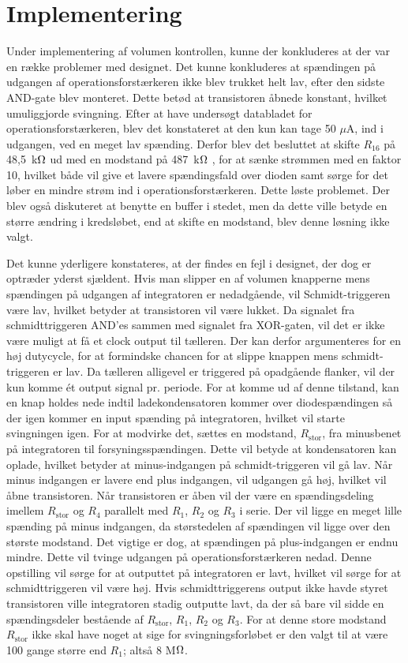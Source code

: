 \section{Implementering}
Under implementering af volumen kontrollen, kunne der konkluderes at der var en række problemer med designet. Det kunne konkluderes at spændingen på udgangen af operationsforstærkeren ikke blev trukket helt lav, efter den sidste AND-gate blev monteret. Dette betød at transistoren åbnede konstant, hvilket umuliggjorde svingning. Efter at have undersøgt databladet for operationsforstærkeren, blev det konstateret at den kun kan tage 50 $\mu$A, ind i udgangen, ved en meget lav spænding. Derfor blev det besluttet at skifte $R_{16}$ på 48,5~k$\ohm$ ud med en modstand på 487~k$\ohm$ , for at sænke strømmen med en faktor 10, hvilket både vil give et lavere spændingsfald over dioden samt sørge for det løber en mindre strøm ind i operationsforstærkeren. Dette løste problemet. Der blev også diskuteret at benytte en buffer i stedet, men da dette ville betyde en større ændring i kredsløbet, end at skifte en modstand, blev denne løsning ikke valgt.

Det kunne yderligere konstateres, at der findes en fejl i designet, der dog er optræder yderst sjældent. Hvis man slipper en af volumen knapperne  mens spændingen på udgangen af integratoren er nedadgående, vil Schmidt-triggeren være lav, hvilket betyder at transistoren vil være lukket. Da signalet fra schmidttriggeren AND'es sammen med signalet fra XOR-gaten, vil det er ikke være muligt at få et clock output til tælleren. Der kan derfor argumenteres for en høj dutycycle, for at formindske chancen for at slippe knappen mens schmidt-triggeren er lav. Da tælleren alligevel er triggered på opadgående flanker, vil der kun komme ét output signal pr. periode. For at komme ud af denne tilstand, kan en knap holdes nede indtil ladekondensatoren kommer over diodespændingen så der igen kommer en input spænding på integratoren, hvilket vil starte svingningen igen. 
For at modvirke det, sættes en modstand, $R_{\mathrm{stor}}$, fra minusbenet på integratoren til forsyningsspændingen. Dette vil betyde at kondensatoren kan oplade, hvilket betyder at minus-indgangen på schmidt-triggeren vil gå lav. Når minus indgangen er lavere end plus indgangen, vil udgangen gå høj, hvilket vil åbne transistoren. Når transistoren er åben vil der være en spændingsdeling imellem $R_{\mathrm{stor}}$ og $R_4$ parallelt med $R_1$, $R_2$ og $R_3$ i serie. Der vil ligge en meget lille spænding på minus indgangen, da størstedelen af spændingen vil ligge over den største modstand. Det vigtige er dog, at spændingen på plus-indgangen er endnu mindre. Dette vil tvinge udgangen på operationsforstærkeren nedad. Denne opstilling vil sørge for at outputtet på integratoren er lavt, hvilket vil sørge for at schmidttriggeren vil være høj. Hvis schmidttriggerens output ikke havde styret transistoren ville integratoren stadig outputte lavt, da der så bare vil sidde en spændingsdeler bestående af $R_{\mathrm{stor}}$, $R_1$, $R_2$ og $R_3$.
For at denne store modstand $R_{\mathrm{stor}}$ ikke skal have noget at sige for svingningsforløbet er den valgt til at være 100 gange større end $R_1$; altså 8 M$\ohm$.